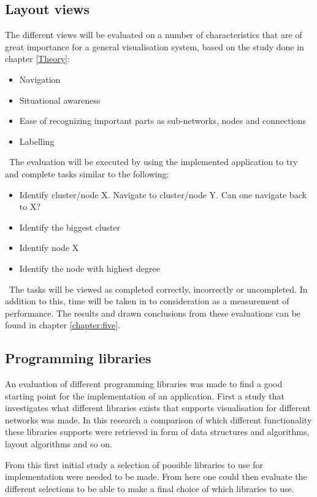 \documentclass[a4paper,11pt]{kth-mag}
\begin{document}
\subsection{Layout views}
\label{sec:evaluation:layoutviews}
The different views will be evaluated on a number of characteristics that are of great importance for a general visualisation system, based on the study done in chapter \ref{Theory}:\
\begin{itemize}
	\item{Navigation}
	\item{Situational awareness}
	\item{Ease of recognizing important parts as sub-networks, nodes and connections}
	\item{Labelling}
\end{itemize}
\
The evaluation will be executed by using the implemented application to try and complete tasks similar to the following:\
\begin{itemize}
	\item{Identify cluster/node X. Navigate to cluster/node Y. Can one navigate back to X?}
	\item{Identify the biggest cluster}
	\item{Identify node X}
	\item{Identify the node with highest degree}
\end{itemize}
\
The tasks will be viewed as completed correctly, incorrectly or uncompleted. In addition to this, time will be taken in to consideration as a measurement of performance. The results and drawn conclusions from these evaluations
can be found in chapter \ref{chapter:five}.
\subsection{Programming libraries}
\label{sec:evaluation:libraries}
An evaluation of different programming libraries was made to find a good starting point for the implementation of an application. First a study that investigates what different libraries exists that supports visualisation 
for different networks was made. In this research a comparison of which different functionality these libraries supports were retrieved in form of data structures and algorithms, layout algorithms and so on.

From this first initial study a selection of possible libraries to use for implementation were needed to be made. From here one could then evaluate the different selections to be able to make a final choice
 of which libraries to use.
\end{document}
